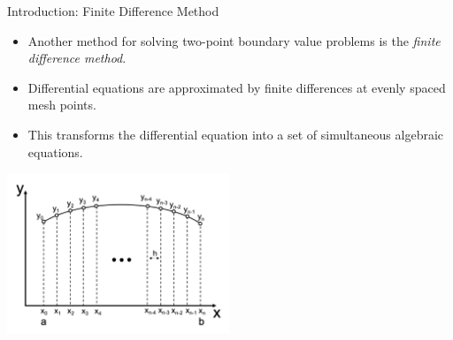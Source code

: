 \documentclass{beamer}
\begin{document}
\begin{frame}{Introduction: Finite Difference Method}
    \begin{itemize}
        \item Another method for solving two-point boundary value problems is the \textit{finite difference method}.
        
            \item Differential equations are approximated by finite differences at evenly spaced mesh points.
            \item This transforms the differential equation into a set of simultaneous algebraic equations.
    \end{itemize}
    \centerline{\includegraphics[width=0.5\textwidth]{FiniteDifference.pdf}}
\end{frame}
\end{document}
